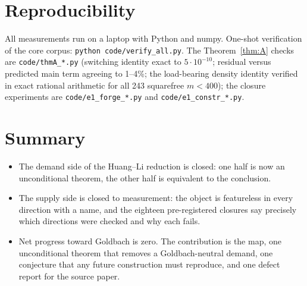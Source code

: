 \documentclass[11pt,a4paper]{article}
\theoremstyle{plain}
\theoremstyle{definition}
\begin{document}
\section{Reproducibility}

All measurements run on a laptop with Python and numpy. One-shot
verification of the core corpus: \texttt{python code/verify\_all.py}.
The Theorem~\ref{thm:A} checks are
\texttt{code/thmA\_*.py} (switching identity exact to $5\cdot10^{-10}$;
residual versus predicted main term agreeing to 1--4\%; the
load-bearing density identity verified in exact rational arithmetic
for all 243 squarefree $m<400$); the closure experiments are
\texttt{code/e1\_forge\_*.py} and \texttt{code/e1\_constr\_*.py}.

\section{Summary}

\begin{itemize}
\item The demand side of the Huang--Li reduction is closed: one half
  is now an unconditional theorem, the other half is equivalent to the
  conclusion.
\item The supply side is closed to measurement: the object is
  featureless in every direction with a name, and the eighteen
  pre-registered closures say precisely which directions were checked
  and why each fails.
\item Net progress toward Goldbach is zero. The contribution is the
  map, one unconditional theorem that removes a Goldbach-neutral
  demand, one conjecture that any future construction must reproduce,
  and one defect report for the source paper.
\end{itemize}
\end{document}

